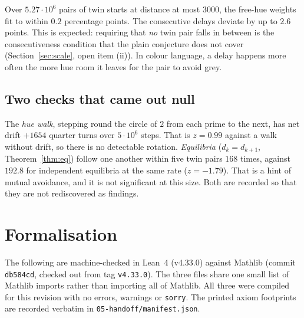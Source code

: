 \documentclass[11pt]{article}
\theoremstyle{plain}
\theoremstyle{definition}
\theoremstyle{remark}
\begin{document}
\noindent
Over $5.27\cdot10^6$ pairs of twin starts at distance at most $3000$, the free-hue weights fit to
within $0.2$ percentage points. The consecutive delays deviate by up to $2.6$ points. This is
expected: requiring that \emph{no} twin pair falls in between is the consecutiveness condition that
the plain conjecture does not cover (Section~\ref{sec:scale}, open item (ii)). In colour language, a
delay happens more often the more hue room it leaves for the pair to avoid grey.

\subsection{Two checks that came out null}

The \emph{hue walk}, stepping round the circle of $2$ from each prime to the next, has net drift
$+1654$ quarter turns over $5\cdot10^6$ steps. That is $z=0.99$ against a walk without drift, so
there is no detectable rotation. \emph{Equilibria} ($d_k=d_{k+1}$, Theorem~\ref{thm:eq}) follow
one another within five twin pairs $168$ times, against $192.8$ for independent equilibria at the
same rate ($z=-1.79$). That is a hint of mutual avoidance, and it is not significant at this size.
Both are recorded so that they are not rediscovered as findings.

\section{Formalisation}

The following are machine-checked in Lean~4 (v4.33.0) against Mathlib (commit \texttt{db584cd},
checked out from tag \texttt{v4.33.0}). The three files share one small list of Mathlib imports
rather than importing all of Mathlib. All three were compiled for this revision with no errors,
warnings or \texttt{sorry}. The printed axiom footprints are recorded verbatim in
\texttt{05-handoff/manifest.json}.
\end{document}
